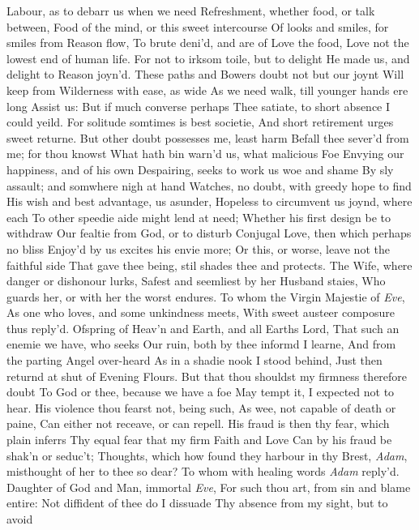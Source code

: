 \documentclass[11pt]{book}
\newcounter {first}
\begin{document}
Labour, as to debarr us when we need 
Refreshment, whether food, or talk between, 
Food of the mind, or this sweet intercourse 
Of looks and smiles, for smiles from Reason flow, 
To brute deni'd, and are of Love the food, 
Love not the lowest end of human life. 
For not to irksom toile, but to delight 
He made us, and delight to Reason joyn'd. 
These paths and Bowers doubt not but our joynt 
Will keep from Wilderness with ease, as wide 
As we need walk, till younger hands ere long 
Assist us: But if much converse perhaps 
Thee satiate, to short absence I could yeild. 
For solitude somtimes is best societie, 
And short retirement urges sweet returne. 
But other doubt possesses me, least harm 
Befall thee sever'd from me; for thou knowst 
What hath bin warn'd us, what malicious Foe 
Envying our happiness, and of his own 
Despairing, seeks to work us woe and shame 
By sly assault; and somwhere nigh at hand 
Watches, no doubt, with greedy hope to find 
His wish and best advantage, us asunder, 
Hopeless to circumvent us joynd, where each 
To other speedie aide might lend at need; 
Whether his first design be to withdraw 
Our fealtie from God, or to disturb 
Conjugal Love, then which perhaps no bliss 
Enjoy'd by us excites his envie more; 
Or this, or worse, leave not the faithful side 
That gave thee being, stil shades thee and protects. 
The Wife, where danger or dishonour lurks, 
Safest and seemliest by her Husband staies, 
Who guards her, or with her the worst endures. 
\quad To whom the Virgin Majestie of \textit{Eve}, 
As one who loves, and some unkindness meets, 
With sweet austeer composure thus reply'd. 
\quad Ofspring of Heav'n and Earth, and all Earths Lord, 
That such an enemie we have, who seeks 
Our ruin, both by thee informd I learne, 
And from the parting Angel over-heard 
As in a shadie nook I stood behind, 
Just then returnd at shut of Evening Flours. 
But that thou shouldst my firmness therefore doubt 
To God or thee, because we have a foe 
May tempt it, I expected not to hear. 
His violence thou fearst not, being such, 
As wee, not capable of death or paine, 
Can either not receave, or can repell. 
His fraud is then thy fear, which plain inferrs 
Thy equal fear that my firm Faith and Love 
Can by his fraud be shak'n or seduc't; 
Thoughts, which how found they harbour in thy Brest, 
\textit{Adam}, misthought of her to thee so dear? 
\quad To whom with healing words \textit{Adam} reply'd. 
Daughter of God and Man, immortal \textit{Eve}, 
For such thou art, from sin and blame entire: 
Not diffident of thee do I dissuade 
Thy absence from my sight, but to avoid 
\end{document}
